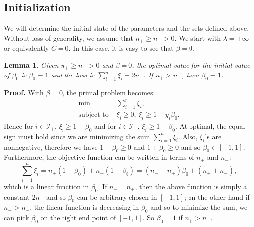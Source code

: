 \documentclass[10pt]{article}
\newtheorem{lamma}{Lemma}[section]
\theoremstyle{definition}
\begin{document}
\subsection{Initialization}
We will determine the initial state of the parameters and the sets defined above. Without loss of generality, we assume that $n_+\geq n_->0$. We start with $\lambda=+\infty$ or equivalently $C=0$. In this case, it is easy to see that $\beta=0$. 
\begin{lamma}
Given $n_+\geq n_->0$ and $\beta=0$, the optimal value for the initial value of $\beta_0$ is $\beta_0 = 1$ and the loss is $\sum_{i=1}^n \xi_i = 2n_-$. If $n_+>n_-$, then $\beta_0 = 1$.\\
\end{lamma}
\noindent\textbf {Proof.} With $\beta=0$, the primal problem becomes:
\[
\begin{array}{rl}
\min & \sum_{i=1}^n \xi_i, \\
\text{subject to } & \xi_i \geq 0, \ \xi_i \geq 1- y_i \beta_0.
\end{array}
\]
Hence for $i\in \mathcal I_+$, $\xi_i \geq 1-\beta_0$ and for $i\in \mathcal I_-$, $\xi_i \geq 1+\beta_0$. At optimal, the equal sign must hold since we are minimizing the sum $\sum_{i=1}^n \xi_i$. Also, $\xi_i$'s are nonnegative, therefore we have $1-\beta_0\geq0$ and $1+\beta_0\geq0$ and so $\beta_0\in [-1,1]$. Furthermore, the objective function can be written in terms of $n_+$ and $n_-$:
\[
\sum_{i=1}^n \xi_i = n_+(1-\beta_0)+ n_-(1+\beta_0) = (n_--n_+)\beta_0 + (n_++n_-), 
\]
which is a linear function in $\beta_0$. If $n_-=n_+$, then the above function is simply a constant $2n_-$ and so $\beta_0$ can be arbitrary chosen in $[-1,1]$; on the other hand if $n_+>n_-$, the linear function is decreasing in $\beta_0$ and so to minimize the sum, we can pick $\beta_0$ on the right end point of $[-1,1]$. So $\beta_0 = 1$ if $n_+>n_-$. \\
\end{document}
